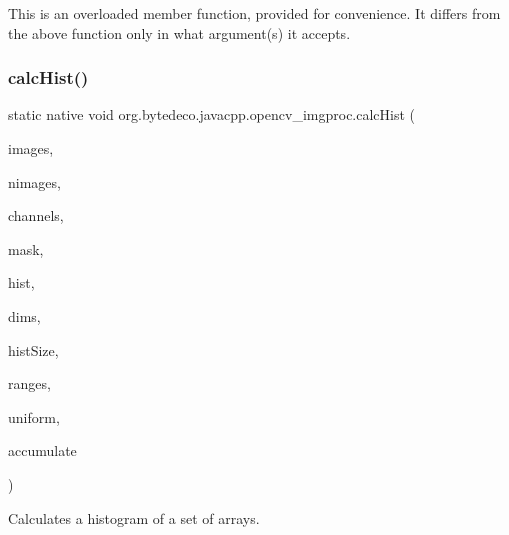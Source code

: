 This is an overloaded member function, provided for convenience. It differs from the above function only in what argument(s) it accepts. \mbox{\label{group__imgproc__hist_ga5d3d264cae4eeaf1ffac100661154b5a}} 
\subsubsection{\texorpdfstring{calc\+Hist()}{calcHist()}\hspace{0.1cm}{\footnotesize\ttfamily [1/3]}}
{\footnotesize\ttfamily static native void org.\+bytedeco.\+javacpp.\+opencv\+\_\+imgproc.\+calc\+Hist (\begin{DoxyParamCaption}\item[{@Const Mat}]{images,  }\item[{int}]{nimages,  }\item[{@Const Int\+Pointer}]{channels,  }\item[{@By\+Val Mat}]{mask,  }\item[{@By\+Val Mat}]{hist,  }\item[{int}]{dims,  }\item[{@Const Int\+Pointer}]{hist\+Size,  }\item[{@Cast(\char`\"{}const float$\ast$$\ast$\char`\"{}) Pointer\+Pointer}]{ranges,  }\item[{@Cast(\char`\"{}bool\char`\"{}) boolean}]{uniform,  }\item[{@Cast(\char`\"{}bool\char`\"{}) boolean}]{accumulate }\end{DoxyParamCaption})\hspace{0.3cm}{\ttfamily [static]}}



Calculates a histogram of a set of arrays. 

